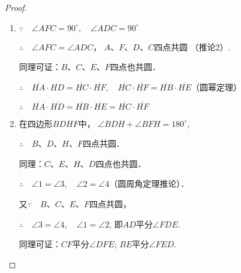 \begin{figure}[htp]
  \centering
{}
  \caption{}
\end{figure}


\begin{proof}
\begin{enumerate}
  \item $\because\quad \angle AFC=90^{\circ},\quad \angle ADC=90^{\circ}$

$\therefore\quad \angle AFC=\angle ADC$，
$A$、$F$、$D$、$C$四点共圆
（推论2）.

同理可证：$B$、$C$、$E$、$F$四点也共圆．

$\therefore\quad \overline{HA}\cdot \overline{HD}=\overline{HC}\cdot \overline{HF},\quad \overline{HC}\cdot \overline{HF}=\overline{HB}\cdot\overline{HE}$（圆幂定理）

$\therefore\quad \overline{HA}\cdot \overline{HD}=\overline{HB}\cdot\overline{HE}=\overline{HC}\cdot \overline{HF}$

\item 在四边形$BDHF$中，
$\angle BDH+\angle BFH=180^{\circ}$,

$\therefore\quad B$、$D$、$H$、$F$四点共圆．

同理：$C$、$E$、$H$、$D$四点也共圆．

$\therefore\quad \angle 1=\angle 3,\quad \angle 2=\angle 4$（圆周角定理推论）．

又$\because\quad B$、$C$、$E$、$F$四点共圆，

$\therefore\quad \angle 3=\angle 4,\quad \angle 1=\angle 2$, 即$AD$平分$\angle FDE$.

同理可证：$CF$平分$\angle DFE$; $BE$平分$\angle FED$.
\end{enumerate}
\end{proof}


